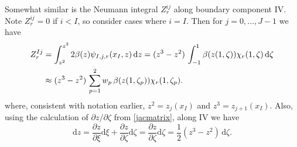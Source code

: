 \documentclass[11pt,final,reqno]{amsart}
\theoremstyle{remark}
\theoremstyle{definition}
\begin{document}
Somewhat similar is the Neumann integral $Z^{ij}_r$ along boundary component IV.  Note $Z^{ij}_r=0$ if $i<I$, so consider cases where $i=I$.  Then for $j=0,\dots,J-1$ we have
\begin{align}
  Z^{Ij}_r &= \int_{z^2}^{z^3} 2 \beta(z) \psi_{I,j,r}(x_I,z) \,\mathrm{d}z = (z^3-z^2)\,\int_{-1}^1 \beta(z(1,\zeta)) \chi_r(1,\zeta)\, \mathrm{d}\zeta \notag \\
           &\approx (z^3-z^2)\,\sum_{p=1}^2 w_p\,\beta(z(1,\zeta_p)) \chi_r(1,\zeta_p). \label{Zapprox}
\end{align}
where, consistent with notation earlier, $z^2 = z_{j}(x_I)$ and $z^3 = z_{j+1}(x_I)$.  Also, using the calculation of $\partial z/\partial \zeta$ from \eqref{jacmatrix}, along IV we have
  $$\mathrm{d}z = \frac{\partial z}{\partial \xi}\mathrm{d}\xi + \frac{\partial z}{\partial \zeta}\mathrm{d}\zeta = \frac{\partial z}{\partial \zeta}\mathrm{d}\zeta = \frac{1}{2} (z^3-z^2)\,\mathrm{d}\zeta.$$

\newcommand{\cole}[1]{\begin{bmatrix}\frac{\partial\chi_{#1}}{\partial \xi} \\ \frac{\partial\chi_{#1}}{\partial \zeta}\end{bmatrix}}
\end{document}
